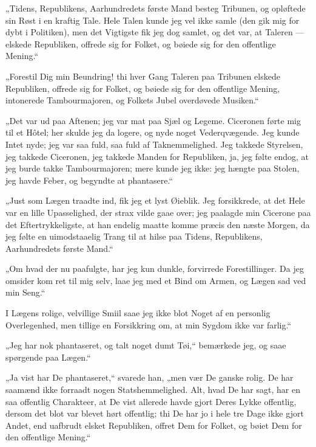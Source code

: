 \documentclass[12pt,a4paper]{book}
\newcommand{\apage}[1]{\marginnote{\footnotesize\textit{[#1]}}}
\begin{document}
„Tidens, Republikens, Aarhundredets første Mand besteg Tribunen, og
opløftede sin Røst i en kraftig Tale. Hele Talen kunde jeg vel ikke
samle (den gik mig for dybt i Politiken), men det Vigtigste fik jeg
dog samlet, og det var, at Taleren --- elskede Republiken, offrede
sig for Folket, og bøiede sig for den offentlige Mening.“

„Forestil Dig min Beundring! thi hver Gang Taleren paa Tribunen
elskede Republiken, offrede sig for Folket, og bøiede sig for den
offentlige Mening, intonerede Tambourmajoren, og Folkets Jubel
overdøvede Musiken.“

„Det var ud paa Aftenen; jeg var mat paa Sjæl og Legeme. Ciceronen
førte mig til et Hôtel; her skulde jeg da logere, og nyde noget
Vederqvægende. Jeg kunde Intet nyde; jeg var saa fuld, saa fuld af
Taknemmelighed. Jeg takkede Styrelsen, jeg takkede Ciceronen, jeg
takkede Manden for Republiken, ja, jeg følte endog, at jeg burde
takke Tambourmajoren; mere kunde jeg ikke: jeg hængte paa Stolen, jeg
havde Feber, og begyndte at phantasere.“

„Just som Lægen traadte ind, fik jeg et lyst Øieblik. Jeg
forsikkrede, at det Hele var en lille Upasselighed, der strax vilde
gaae over; jeg paalagde min Cicerone paa det Eftertrykkeligste, at
han endelig maatte komme præcis den næste Morgen, da jeg følte en
uimodstaaelig Trang til at hilse paa Tidens, Republikens,
Aarhundredets første Mand.“

„Om hvad der nu paafulgte, har jeg kun dunkle, forvirrede
Forestillinger. Da jeg omsider kom ret til mig selv, laae jeg med et
Bind om Armen, og Lægen sad ved min Seng.“

I Lægens rolige, velvillige Smiil saae jeg ikke blot Noget af en
personlig Overlegenhed, men tillige en Forsikkring om, at min Sygdom
ikke var farlig.“ \apage{60}

„Jeg har nok phantaseret, og talt noget dumt Tøi,“ bemærkede jeg, og
saae spørgende paa Lægen.“

„Ja vist har De phantaseret,“ svarede han, „men vær De ganske rolig.
De har saamænd ikke forraadt nogen Statshemmelighed. Alt, hvad De har
sagt, har en saa offentlig Charakteer, at De vist allerede havde
gjort Deres Lykke offentlig, dersom det blot var blevet hørt
offentlig; thi De har jo i hele tre Dage ikke gjort Andet, end
uafbrudt elsket Republiken, offret Dem for Folket, og bøiet Dem for
den offentlige Mening.“
\end{document}
